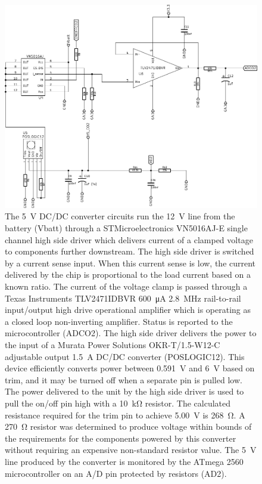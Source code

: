 \documentclass[numbook, envcountsect, envcountsame, envcountreset, runningheads, twocolumn]{svjour3}
\begin{document}
			\begin{figure}[!t]
				\centering
				\includegraphics[width=\columnwidth,height=0.8\columnwidth,keepaspectratio]{zoom03.pdf}
				\caption[Circuit - 5 V Dc/DC converter circuit]{The \SI{5}{\volt} DC/DC converter circuits run the \SI{12}{\volt} line from the battery (Vbatt) through a STMicroelectronics VN5016AJ-E single channel high side driver which delivers current of a clamped voltage to components further downstream.  The high side driver is switched by a current sense input.  When this current sense is low, the current delivered by the chip is proportional to the load current based on a known ratio.  The current of the voltage clamp is passed through a Texas Instruments TLV2471IDBVR \SI{600}{\micro\ampere} \SI{2.8}{\mega\hertz} rail-to-rail input/output high drive operational amplifier which is operating as a closed loop non-inverting amplifier.  Status is reported to the microcontroller (ADCO2).  The high side driver delivers the power to the input of a Murata Power Solutions OKR-T/1.5-W12-C adjustable output \SI{1.5}{\ampere} DC/DC converter (POSLOGIC12).  This device efficiently converts power between \SI{0.591}{\volt} and \SI{6}{\volt} based on trim, and it may be turned off when a separate pin is pulled low.  The power delivered to the unit by the high side driver is used to pull the on/off pin high with a \SI{10}{\kilo\ohm} resistor.   The calculated resistance required for the trim pin to achieve \SI{5.00}{\volt} is \SI{268}{\ohm}.  A \SI{270}{\ohm} resistor was determined to produce voltage within bounds of the requirements for the components powered by this converter without requiring an expensive non-standard resistor value.  The \SI{5}{\volt} line produced by the converter is monitored by the ATmega 2560 microcontroller on an A/D pin protected by resistors (AD2).}
				\label{fig:zoom03}
			\end{figure}
		
\end{document}
